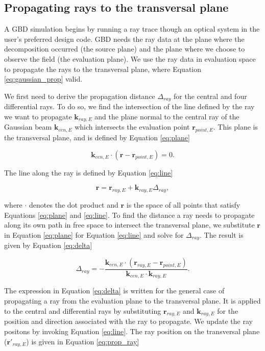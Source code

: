 \subsection{Propagating rays to the transversal plane}
A GBD simulation begins by running a ray trace though an optical system in the user's preferred design code. GBD needs the ray data at the plane where the decomposition occurred (the source plane) and the plane where we choose to observe the field (the evaluation plane). We use the ray data in evaluation space to propagate the rays to the transversal plane, where Equation \ref{eq:gaussian_prop} valid.

We first need to derive the propagation distance $\Delta_{ray}$ for the central and four differential rays. To do so, we find the intersection of the line defined by the ray we want to propagate $\mathbf{k}_{ray,E}$ and the plane normal to the central ray of the Gaussian beam $\mathbf{k}_{cen,E}$ which intersects the evaluation point $\mathbf{r}_{point,E}$. This plane is the transversal plane, and is defined by Equation \ref{eq:plane}

\begin{equation}
    \mathbf{k}_{cen,E} \cdot (\mathbf{r} - \mathbf{r}_{point,E}) = 0.
    \label{eq:plane}
\end{equation}

The line along the ray is defined by Equation \ref{eq:line}

\begin{equation}
    \mathbf{r} = \mathbf{r}_{ray,E} + \mathbf{k}_{ray,E}\Delta_{ray},
    \label{eq:line}
\end{equation}

where $\cdot$ denotes the dot product and $\mathbf{r}$ is the space of all points that satisfy Equations \ref{eq:plane} and \ref{eq:line}. To find the distance a ray needs to propagate along its own path in free space to intersect the transversal plane, we substitute $\mathbf{r}$ in Equation \ref{eq:plane} for Equation \ref{eq:line} and solve for $\Delta_{ray}$. The result is given by Equation \ref{eq:delta}


\begin{equation}
    \Delta_{ray} = - \frac{\mathbf{k}_{cen,E} \cdot (\mathbf{r}_{ray,E} - \mathbf{r}_{point,E})}{\mathbf{k}_{cen,E} \cdot \mathbf{k}_{ray,E}}.
    \label{eq:delta}
\end{equation}

The expression in Equation \ref{eq:delta} is written for the general case of propagating a ray from the evaluation plane to the transversal plane. It is applied to the central and differential rays by substituting $\mathbf{r}_{ray,E}$ and $\mathbf{k}_{ray,E}$ for the position and direction associated with the ray to propagate. We update the ray positons by invoking Equation \ref{eq:line}. The ray position on the transversal plane ($\mathbf{r}'_{ray,E}$) is given in Equation \ref{eq:prop_ray}

